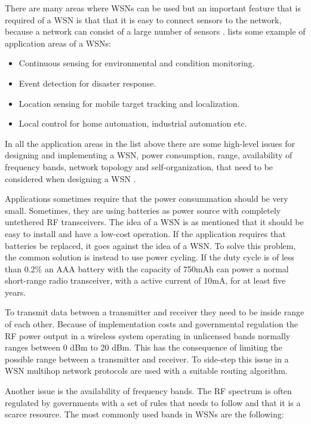 There are many areas where WSNs can be used but an important feature that is required of a WSN is that that it is easy to connect sensors to the network, because a network can consist of a large number of sensors \citep{gutierrez2004low}. \citet{yang2014internet} lists some example of application areas of a WSNs:

\begin{itemize}
   \item Continuous sensing for environmental and condition monitoring.
   \item Event detection for disaster response.
   \item Location sensing for mobile target tracking and localization.
   \item Local control for home automation, industrial automation etc.
\end{itemize}

In all the application areas in the list above there are some high-level issues for designing and implementing a WSN, power consumption, range, availability of frequency bands, network topology and self-organization, that need to be considered when designing a WSN \citep{gutierrez2004low}.

Applications sometimes require that the power consummation should be very small. Sometimes, they are using batteries as power source with completely untethered RF transceivers. The idea of a WSN is as mentioned that it should be easy to install and have a low-cost operation. If the application requires that batteries be replaced, it goes against the idea of a WSN. To solve this problem, the common solution is instead to use power cycling. If the duty cycle is of less than 0.2\% an AAA battery with the capacity of 750mAh can power a normal short-range radio transceiver, with a active current of 10mA, for at least five years. 

To transmit data between a transmitter and receiver they need to be inside range of each other. Because of implementation costs and governmental regulation the RF power output in a wireless system operating in unlicensed bands normally ranges between 0 dBm to 20 dBm. This has the consequence of limiting the possible range between a transmitter and receiver. To side-step this issue in a WSN multihop network protocols are used with a suitable routing algorithm.

Another issue is the availability of frequency bands. The RF spectrum is often regulated by governments with a set of rules that needs to follow and that it is a scarce resource. The most commonly used bands in WSNs are the following:

